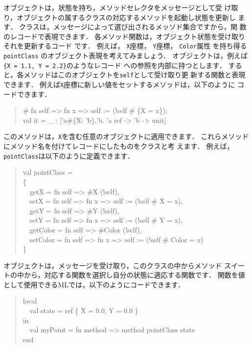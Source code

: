 \documentclass{jbook}
\newcommand{\myem}{\mbox{\ \ }}
\begin{document}
	オブジェクトは，状態を持ち，メソッドセレクタをメッセージとして受
け取り，オブジェクトの属するクラスの対応するメソッドを起動し状態を更新し
ます．
	クラスは，メッセージによって選び出されるメッソド集合ですから，関
数のレコードで表現できます．
	各メソッド関数は，オブジェクト状態を受け取りそれを更新するコード
です．
	例えば，
{\tt X}座標，
{\tt Y}座標，
{\tt Color}属性
を持ち得る
{\tt pointClass}
のオブジェクト表現を考えてみましょう．
	オブジェクトは，例えば{\tt \{X = 1.1, Y = 2.2\}}のようなレコード
への参照を内部に持つとします．
	すると，各メソッドはこのオブジェクトを{\tt self}として受け取り更
新する関数と表現できます．
	例えば{\tt X}座標に新しい値をセットするメソッドは，以下のように
コードできます．
\begin{tt}
\begin{quote}
\# fn self => fn x => self := (!self \# \{X = x\});\\
val it = \_ : ['a\#\{X: 'b\},'b. 'a ref -> 'b -> unit]
\end{quote}
\end{tt}
	このメソッドは，{\tt X}を含む任意のオブジェクトに適用できます．
	これらメソッドにメソッド名を付けてレコードにしたものをクラスと考
えます．
	例えば，{\tt pointClass}は以下のように定義できます．
\begin{tt}
\begin{quote}
val pointClass =\\
\{\\
\myem  getX = fn self => \#X (!self),\\
\myem  setX = fn self => fn x => self := (!self \# {X = x}),\\
\myem  getY = fn self => \#Y (!self),\\
\myem  setY = fn self => fn x => self := (!self \# {Y = x}),\\
\myem  getColor = fn self => \#Color (!self),\\
\myem  setColor = fn self => fn x => self := (!self \# {Color = x})\\
\}
\end{quote}
\end{tt}
	オブジェクトは，メッセージを受け取り，このクラスの中からメソッド
スイートの中から，対応する関数を選択し自分の状態に適応する関数です．
	関数を値として使用できるMLでは，以下のようにコードできます．
\begin{tt}
\begin{quote}
local\\
\myem  val state =  ref \{ X = 0.0, Y = 0.0 \}\\
in \\
\myem val myPoint = fn method => method pointClass state\\
end
\end{quote}
\end{tt}
\end{document}

